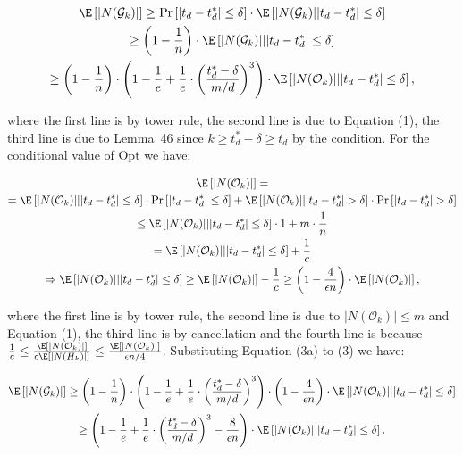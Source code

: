 \[\begin{gathered}
\displaystyle\E\left[|N(\mathcal{G}_{k})|\right] \displaystyle\geq\Pr\left[|t_{d}-t^{*}_{d}|\leq\delta\right]\cdot\E\left[|N(\mathcal{G}_{k})\middle||t_{d}-t^{*}_{d}|\leq\delta\right] \\
\displaystyle\geq\left(1-\frac{1}{n}\right)\cdot\E\left[|N(\mathcal{G}_{k})|\middle||t_{d}-t^{*}_{d}|\leq\delta\right] \\
\displaystyle\geq\left(1-\frac{1}{n}\right)\cdot\left(1-\frac{1}{e}+\frac{1}{e}\cdot\left(\frac{t^{*}_{d}-\delta}{m/d}\right)^{3}\right)\cdot\E\left[|N(\mathcal{O}_{k})|\middle||t_{d}-t^{*}_{d}|\leq\delta\right],
\end{gathered}\]


where the first line is by tower rule, the second line is due to Equation (1), the third line is due to Lemma 46 since $k\geq t^{*}_{d}-\delta\geq t_{d}$ by the condition.
For the conditional value of Opt we have:\par


\[\begin{gathered}
\displaystyle\E \displaystyle\left[|N(\mathcal{O}_{k})|\right]= \\
\displaystyle=\E\left[|N(\mathcal{O}_{k})|\middle||t_{d}-t^{*}_{d}|\leq\delta\right]\cdot\Pr\left[|t_{d}-t^{*}_{d}|\leq\delta\right]+\E\left[|N(\mathcal{O}_{k})|\middle||t_{d}-t^{*}_{d}|>\delta\right]\cdot\Pr\left[|t_{d}-t^{*}_{d}|>\delta\right] \\
\displaystyle\leq\E\left[|N(\mathcal{O}_{k})|\middle||t_{d}-t^{*}_{d}|\leq\delta\right]\cdot 1+m\cdot\frac{1}{n} \\
\displaystyle=\E\left[|N(\mathcal{O}_{k})|\middle||t_{d}-t^{*}_{d}|\leq\delta\right]+\frac{1}{c} \\
\displaystyle\Rightarrow\E\left[|N(\mathcal{O}_{k})|\middle||t_{d}-t^{*}_{d}|\leq\delta\right]\geq\E\left[|N(\mathcal{O}_{k})|\right]-\frac{1}{c}\geq\left(1-\frac{4}{\epsilon n}\right)\cdot\E\left[|N(\mathcal{O}_{k})|\right],
\end{gathered}\]


where the first line is by tower rule, the second line is due to $|N(\mathcal{O}_{k})|\leq m$ and Equation (1), the third line is by cancellation and the fourth line is because $\frac{1}{c}\leq\frac{\E\left[|N(\mathcal{O}_{k})|\right]}{c\E\left[|N(H_{k})|\right]}\leq\frac{\E\left[|N(\mathcal{O}_{k})|\right]}{\epsilon n/4}$.
Substituting Equation (3a) to (3) we have:\par


\[\begin{gathered}
\displaystyle\E\left[|N(\mathcal{G}_{k})|\right] \displaystyle\geq\left(1-\frac{1}{n}\right)\cdot\left(1-\frac{1}{e}+\frac{1}{e}\cdot\left(\frac{t^{*}_{d}-\delta}{m/d}\right)^{3}\right)\cdot\left(1-\frac{4}{\epsilon n}\right)\cdot\E\left[|N(\mathcal{O}_{k})|\middle||t_{d}-t^{*}_{d}|\leq\delta\right] \\
\displaystyle\geq\left(1-\frac{1}{e}+\frac{1}{e}\cdot\left(\frac{t^{*}_{d}-\delta}{m/d}\right)^{3}-\frac{8}{\epsilon n}\right)\cdot\E\left[|N(\mathcal{O}_{k})|\middle||t_{d}-t^{*}_{d}|\leq\delta\right].
\end{gathered}\]


